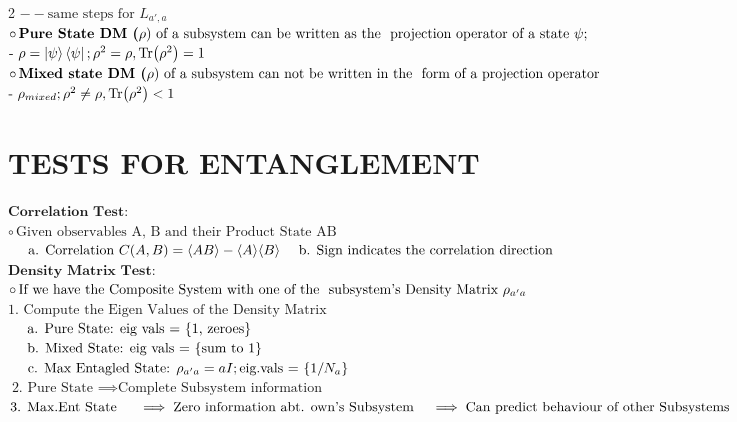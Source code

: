 \documentclass[10pt,a4paper]{article}
\begin{document}
\begin{multicols}{2}
$-  - \text{same steps for }L_{a',a}$\\
$\circ\, \textbf{Pure State DM (} \rho \text{) of a subsystem can be written as the }\\\text{ projection operator of a state }\psi;$\\
$\text{- }\rho=\ket{\psi}\bra{\psi}; \rho^2 = \rho, \Tr(\rho^2) = 1$\\
$\circ\,\textbf{Mixed state DM (} \rho \text{) of a subsystem can not be written in the }\\\text{  form of a }\text{projection operator}$\\
$\text{- }\rho_{mixed}; \rho^2 \neq \rho, \Tr(\rho^2) < 1$\\

\section{TESTS FOR ENTANGLEMENT}
$\textbf{Correlation Test:}$\\
$\circ\,\text{Given observables A, B and their Product State AB}$ \\
$\text{\hspace{1em} a.  Correlation } C(A, B) = \langle AB \rangle - \langle A \rangle \langle B \rangle \\ \text{\hspace{1em} b. Sign indicates the correlation direction}$\\
$\textbf{Density Matrix Test:}$\\
$\circ\,\text{If we  have the Composite System with one of the }\\\text{ subsystem's Density Matrix } \rho_{a'a}$\\
$\text{1. Compute the Eigen Values of the Density Matrix}$\\
$\text{\hspace{1em} a. Pure State: eig vals = \{1, zeroes\}}$\\
$\text{\hspace{1em} b. Mixed State: eig vals = \{sum to 1\}}$\\
$\text{\hspace{1em} c. Max Entagled State: } \rho_{a'a} = aI;  \text{eig.vals = } \{1/N_a\}$\\
$\text{2. Pure State } \implies \text{Complete Subsystem information}$\\
$\text{3. Max.Ent State } \\ 
\text{\hspace{1em}} \implies \text{Zero information abt. own's Subsystem}\\
\text{\hspace{1em}} \implies \text{Can predict behaviour of other Subsystems}$\\


\end{multicols}
\end{document}
